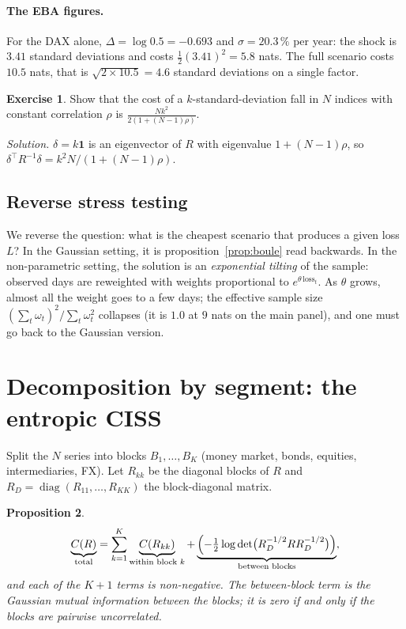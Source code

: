 \documentclass[11pt]{article}
\theoremstyle{plain}
\newtheorem{proposition}{Proposition}[section]
\theoremstyle{definition}
\newtheorem{exercice}[proposition]{Exercise}
\theoremstyle{remark}
\begin{document}
\paragraph{The EBA figures.} For the DAX alone, $\Delta=\log0.5=-0.693$ and
$\sigma=20.3\,\%$ per year: the shock is $3.41$ standard deviations and costs
$\tfrac12(3.41)^2=5.8$ nats. The full scenario costs $10.5$ nats, that is
$\sqrt{2\times10.5}=4.6$ standard deviations on a single factor.

\begin{exercice}
Show that the cost of a $k$-standard-deviation fall in $N$ indices with
constant correlation $\rho$ is $\tfrac{N k^2}{2(1+(N-1)\rho)}$.
\end{exercice}
\noindent\emph{Solution.} $\delta=k\mathbf 1$ is an eigenvector of $R$ with
eigenvalue $1+(N-1)\rho$, so $\delta^\top R^{-1}\delta=k^2N/(1+(N-1)\rho)$.

\subsection{Reverse stress testing}

We reverse the question: what is the cheapest scenario that produces a given
loss $L$? In the Gaussian setting, it is proposition~\ref{prop:boule} read
backwards. In the non-parametric setting, the solution is an
\emph{exponential tilting} of the sample: observed days are reweighted with
weights proportional to $e^{\theta\,\text{loss}_t}$. As $\theta$ grows, almost
all the weight goes to a few days; the effective sample size
$(\sum_t\omega_t)^2/\sum_t\omega_t^2$ collapses (it is $1.0$ at $9$ nats on
the main panel), and one must go back to the Gaussian version.

\section{Decomposition by segment: the entropic CISS}
\label{sec:blocs}

Split the $N$ series into blocks $B_1,\dots,B_K$ (money market, bonds,
equities, intermediaries, FX). Let $R_{kk}$ be the diagonal blocks of $R$ and
$R_D=\operatorname{diag}(R_{11},\dots,R_{KK})$ the block-diagonal matrix.

\begin{proposition}
\label{prop:blocs}
\[
\underbrace{C(R)}_{\text{total}}
=\sum_{k=1}^K\underbrace{C(R_{kk})}_{\text{within block }k}
+\underbrace{\Bigl(-\tfrac12\log\det\bigl(R_D^{-1/2}RR_D^{-1/2}\bigr)\Bigr)}_{\text{between blocks}},
\]
and each of the $K+1$ terms is non-negative. The between-block term is the
Gaussian mutual information between the blocks; it is zero if and only if the
blocks are pairwise uncorrelated.
\end{proposition}
\end{document}
